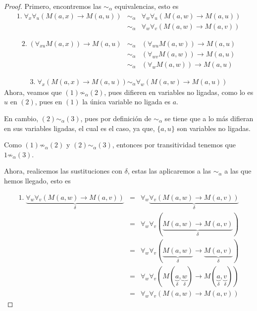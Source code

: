 \documentclass{article}
\begin{document}
\begin{proof}
  Primero, encontremos las $\sim_{\alpha}$ equivalencias, esto es
  \begin{eqnarray*}
    1.\; \forall_{x}\forall_{u}\left(M(a,x) \rightarrow M(a,u)\right)
    &\sim_{\alpha}& \forall_{w}\forall_{u}(M(a, w) \rightarrow M(a, u))\\
    &\sim_{\alpha}& \forall_{w}\forall_{v}(M(a, w) \rightarrow M(a, v))
  \end{eqnarray*}
  
  \begin{eqnarray*}
    2.\; (\forall_{xu}M(a,x)) \rightarrow M(a,u)
    &\sim_{\alpha}& (\forall_{wu}M(a, w)) \rightarrow M(a, u)\\
    &\sim_{\alpha}& (\forall_{wv}M(a, w)) \rightarrow M(a, u)\\
    &\sim_{\alpha}& (\forall_{w}M(a, w)) \rightarrow M(a, u)
  \end{eqnarray*}
  
  \begin{eqnarray*}
    3.\; \forall_{x}\left(M(a,x) \rightarrow M(a,u)\right)
    \sim_{\alpha} \forall_{w}\left(M(a,w) \rightarrow M(a,u)\right)
  \end{eqnarray*}
  Ahora, veamos que $(1) \not\sim_{\alpha} (2)$, pues difieren en
  variables no ligadas, como lo es $u$ en $(2)$, pues en $(1)$ la
  única variable no ligada es $a$.
  
  En cambio, $(2) \sim_{\alpha} (3)$, pues por definición de $\sim_{\alpha}$
  se tiene que a lo más difieran en sus variables ligadas, el cual es el caso,
  ya que, $\{a, u\}$ son variables no ligadas.
  
  Como $(1) \not\sim_{\alpha} (2)$ y $(2) \sim_{\alpha} (3)$, entonces por
  transitividad tenemos que $1 \not \sim_{\alpha} (3)$.
  
  Ahora, realicemos las sustituciones con $\delta$, estas las aplicaremos a
  las $\sim_{\alpha}$ a las que hemos llegado, esto es
  
  \begin{eqnarray*}
    1.\; \underbrace{\forall_{w}\forall_{v}(M(a, w) \rightarrow M(a, v))}_{\delta}
    &=& \forall_{w}\underbrace{\forall_{v}(M(a, w) \rightarrow M(a, v))}_{\delta}\\
    &=& \forall_{w}\forall_{v}(\underbrace{M(a, w) \rightarrow M(a, v)}_{\delta})\\
    &=& \forall_{w}\forall_{v}(\underbrace{M(a, w)}_{\delta} \rightarrow \underbrace{M(a, v)}_{\delta})\\
    &=& \forall_{w}\forall_{v}(M(\underbrace{a}_{\delta}, \underbrace{w}_{\delta}) \rightarrow M(\underbrace{a}_{\delta}, \underbrace{v}_{\delta}))\\
    &=& \forall_{w}\forall_{v}(M(a, w) \rightarrow M(a, v))
  \end{eqnarray*}
  

\end{proof}
\end{document}
